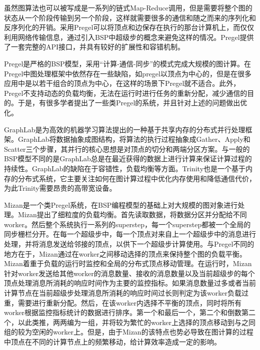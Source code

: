 虽然图算法也可以被写成是一系列的链式Map-Reduce调用，但是需要将整个图的状态从一个阶段传输到另一个阶段，这样就需要很多的通信和随之而来的序列化和反序列化的开销。采用Pregel可以将顶点和边保存在执行的那台计算机上，而仅仅利用网络传输信息，通过引入BSP中超级步的概念来避免这样的情况。Pregel提供了一套完整的API接口，并具有较好的扩展性和容错机制。

Pregel是严格的BSP模型，采用“计算-通信-同步”的模式完成大规模的图计算。在Pregel中图处理框架中依然存在一些缺陷，如pregel以顶点为中心的，但是在很多应用中是以若干组合的顶点为中心，在这样的场景下Pregel就不适合。此外，Pregel不支持动态的负载均衡，无法在运行时进行任务的重新分配，减少通信的目的。于是，有很多学者提出了一些类Pregel的系统，并且针对上述的问题做出优化。

GraphLab\cite{low2010graphlab}是为高效的机器学习算法提出的一种基于共享内存的分布式并行处理框架。GraphLab将数据抽象成图结构，将算法的执行过程抽象成Gather、Apply和Scatter三个步骤，其并行的核心思想是对顶点的切分和两端分区方案。与一般的BSP模型不同的是GraphLab总是在最近获得的数据上进行计算来保证计算过程的持续性。GraphLab的缺陷在于容错性，负载均衡等方面。Trinity\cite{shao2013trinity}也是一个基于内存的分布式系统，它主要关注如何在图计算过程中优化内存使用和降低通信代价，为此Trinity需要昂贵的高带宽设备。

Mizan\cite{khayyat2013mizan}是一个类Pregel系统，在BSP编程模型的基础上对大规模的图对象进行处理。Mizan提出了细粒度的负载均衡。首先读取数据，将数据分区并分配给不同worker。然后整个系统执行一系列的superstep，每一个superstep都被一个全局的同步栅栏分开。在每一个超级步中，每一个顶点对来自上一个超级步中的消息进行处理，并将消息发送给邻接的顶点，以供下一个超级步计算使用。与Pregel不同的地方在于，Mizan通过在worker之间移动选择的顶点来保持整个图的负载平衡。Mizan着重于负载的运行时监控和全局的分布式顶点移动管理。在运行时，Mizan针对worker发送给其他worker的消息数量、接收的消息数量以及当前超级步的每个顶点处理消息所消耗的响应时间作为主要的监控指标。如果消息数量过多或者当前计算节点在当前超级步处理消息所消耗的响应时间过长则判定为该worker负载过重，需要进行重新分配。然后，在该worker内选择不平衡的顶点，同时将所有worker根据监控指标统计的数据进行排序。第一个和最后一个，第二个和倒数第二个，以此类推，两两编为一组，并将较为繁忙的worker上选择的顶点移动到与之同组的较为空闲的worker上。但是，由于Mizan的该特点也势必导致在图计算的过程中顶点在不同的计算节点上的频繁移动，给计算效率造成一定的影响。

